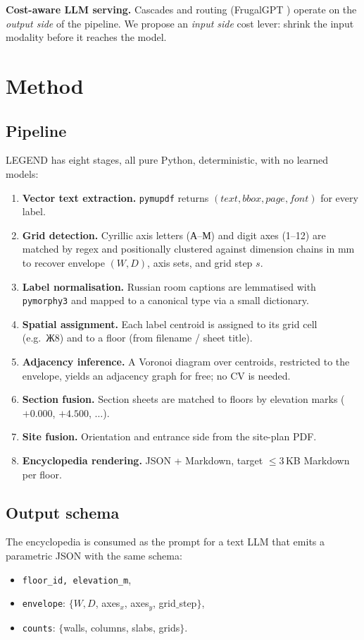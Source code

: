 \documentclass[conference]{IEEEtran}
\begin{document}
\textbf{Cost-aware LLM serving.} Cascades and routing
(FrugalGPT \cite{frugalgpt}) operate on the \emph{output side} of the
pipeline. We propose an \emph{input side} cost lever: shrink the input
modality before it reaches the model.

\section{Method}
\subsection{Pipeline}
LEGEND has eight stages, all pure Python, deterministic, with no learned
models:
\begin{enumerate}
\item \textbf{Vector text extraction.} \texttt{pymupdf} returns
$(text, bbox, page, font)$ for every label.
\item \textbf{Grid detection.} Cyrillic axis letters (А--М) and digit axes
(1--12) are matched by regex and positionally clustered against dimension
chains in mm to recover envelope $(W, D)$, axis sets, and grid step $s$.
\item \textbf{Label normalisation.} Russian room captions are lemmatised
with \texttt{pymorphy3} and mapped to a canonical type via a small dictionary.
\item \textbf{Spatial assignment.} Each label centroid is assigned to its
grid cell (e.g.\ Ж8) and to a floor (from filename / sheet title).
\item \textbf{Adjacency inference.} A Voronoi diagram over centroids,
restricted to the envelope, yields an adjacency graph for free; no CV is
needed.
\item \textbf{Section fusion.} Section sheets are matched to floors by
elevation marks ($+0.000$, $+4.500$, $\ldots$).
\item \textbf{Site fusion.} Orientation and entrance side from the
site-plan PDF.
\item \textbf{Encyclopedia rendering.} JSON + Markdown, target
$\le$3\,KB Markdown per floor.
\end{enumerate}

\subsection{Output schema}
The encyclopedia is consumed as the prompt for a text LLM that emits a
parametric JSON with the same schema:
\begin{itemize}
\item \texttt{floor\_id, elevation\_m},
\item \texttt{envelope}: $\{W, D$, axes$_x$, axes$_y$, grid$\_$step$\}$,
\item \texttt{counts}: $\{$walls, columns, slabs, grids$\}$.
\end{itemize}
\end{document}
